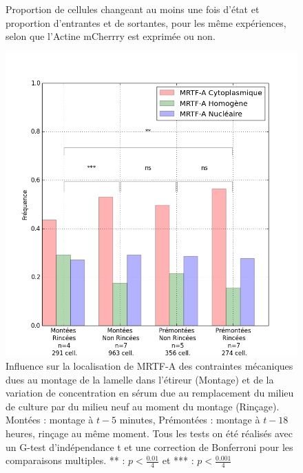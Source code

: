 \documentclass                                                                                                                                                                                                                                                                                                                                       {report}
\begin{document}
\begin{figure}[p]
\caption{\label{AMC}Répartition initiale pour des cellules issues des mêmes expériences exprimant ou non le plasmide Actine mCherry (683 cellules témoin et 538 cellules expriment l'Actine mCherry). **** : $p<10^{-4}$}\caption{\label{AMC_transloc}Proportion de cellules changeant au moins une fois d'état et proportion d'entrantes et de sortantes, pour les même expériences, selon que l'Actine mCherrry est exprimée ou non.}
\end{figure}

\begin{figure}[p]
\includegraphics[scale=0.5]{Figures/CHN_montage_rincage.png} 
\caption{\label{CHN_montage} Influence sur la localisation de MRTF-A des contraintes mécaniques dues au montage de la lamelle dans l'étireur (Montage) et de la variation de concentration en sérum due au remplacement du milieu de culture par du milieu neuf au moment du montage (Rinçage). Montées : montage à $t-5$ minutes, Prémontées : montage à $t-18$ heures, rinçage au même moment.
Tous les tests on été réalisés avec un G-test d'indépendance t et une correction de Bonferroni pour les comparaisons multiples. ** : $p<\frac{0.01}{4}$ et *** : $p<\frac{0.001}{4}$}
\end{figure}
\end{document}
